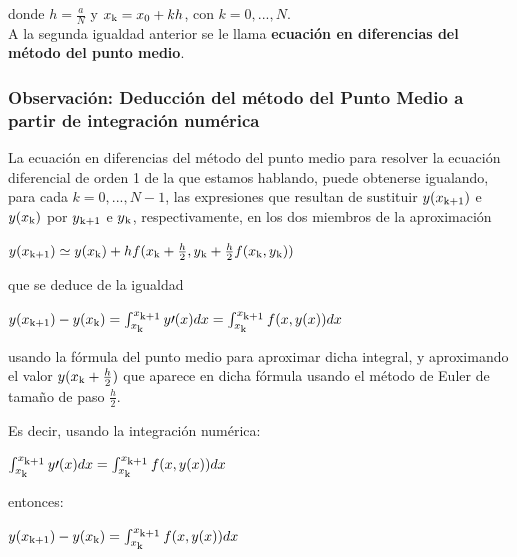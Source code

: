 \documentclass[paper=a4, fontsize=11pt]{scrartcl} %
\numberwithin{equation}{section}
\begin{document}
	donde $h = \frac{a}{N}$ y $x\textsubscript{k} = x\textsubscript{0} + kh$, con $k = 0,...,N$.\\
	
	A la segunda igualdad anterior se le llama \textbf{ecuación en diferencias del método del punto medio}.\\
	
	
	\subsubsection{Observación: Deducción del método del Punto Medio a partir de integración numérica}
	La ecuación en diferencias del método del punto medio para resolver la ecuación diferencial de orden 1 de la que estamos hablando, puede obtenerse igualando, para cada $k = 0,...,N-1$, las expresiones que resultan de sustituir $y(x\textsubscript{k+1})$ e $y(x\textsubscript{k})$ por $y\textsubscript{k+1}$ e $y\textsubscript{k}$, respectivamente, en los dos miembros de la aproximación\\
	\begin{center}
		$y(x\textsubscript{k+1}) \simeq y(x\textsubscript{k}) + hf(x\textsubscript{k} + \frac{h}{2}, y\textsubscript{k} + \frac{h}{2}f(x\textsubscript{k},y\textsubscript{k}))$
	\end{center}
	
	\setlength{\parskip}{10pt}que se deduce de la igualdad
	\begin{center}
		$y(x\textsubscript{k+1})- y(x\textsubscript{k}) = \int_{x\textsubscript{k}}^{x\textsubscript{k+1}} y\prime(x) dx = \int_{x\textsubscript{k}}^{x\textsubscript{k+1}} f(x, y(x)) dx$
	\end{center}
	
	usando la fórmula del punto medio para aproximar dicha integral, y aproximando el valor $y(x\textsubscript{k} + \frac{h}{2})$ que aparece en dicha fórmula usando el método de Euler de tamaño de paso $\frac{h}{2}$.
	
	
	Es decir, usando la integración numérica:
	\begin{center}	
		$\int_{x\textsubscript{k}}^{x\textsubscript{k+1}} y\prime(x) dx = \int_{x\textsubscript{k}}^{x\textsubscript{k+1}} f(x, y(x)) dx$
		
		\setlength{\parskip}{10pt}entonces:	
		
		\setlength{\parskip}{10pt}$y(x\textsubscript{k+1}) - y(x\textsubscript{k}) = \int_{x\textsubscript{k}}^{x\textsubscript{k+1}} f(x, y(x)) dx$
	\end{center}
	
\end{document}
